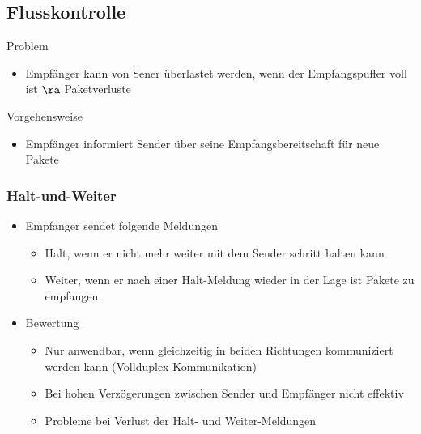   \subsection{Flusskontrolle}
    Problem
    \begin{itemize}
      \item Empfänger kann von Sener überlastet werden, wenn der Empfangspuffer voll ist $\ra$
        Paketverluste
    \end{itemize}
    Vorgehensweise
    \begin{itemize}
      \item Empfänger informiert Sender über seine Empfangsbereitschaft für neue Pakete
    \end{itemize}
    \subsubsection{Halt-und-Weiter}
      \begin{itemize}
        \item Empfänger sendet folgende Meldungen
          \begin{itemize}
            \item Halt, wenn er nicht mehr weiter mit dem Sender schritt halten kann
            \item Weiter, wenn er nach einer Halt-Meldung wieder in der Lage ist Pakete zu empfangen
          \end{itemize}
        \item Bewertung
          \begin{itemize}
            \item Nur anwendbar, wenn gleichzeitig in beiden Richtungen kommuniziert werden kann
              (Vollduplex Kommunikation)
            \item Bei hohen Verzögerungen zwischen Sender und Empfänger nicht effektiv
            \item Probleme bei Verlust der Halt- und Weiter-Meldungen
          \end{itemize}
      \end{itemize}
